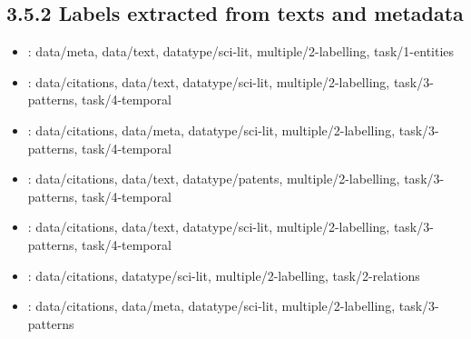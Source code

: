 \begin {refsection}
\section [3.5.2 Labels extracted from texts and metadata] {3.5.2 Labels extracted from texts and metadata}

\begin {itemize}
\item \cite {strobelt-2009-document-cards:-a-top-trumps-visualization-for-documents}:
    data/meta, data/text, datatype/sci-lit, multiple/2-labelling, task/1-entities


\item \cite {morris-2003-time-line-visualization-of-research-fronts}:
    data/citations, data/text, datatype/sci-lit, multiple/2-labelling, task/3-patterns, task/4-temporal


\item \cite {chen-2006-citespace-ii:-detecting-and-visualizing-emerging-trends}:
    data/citations, data/meta, datatype/sci-lit, multiple/2-labelling, task/3-patterns, task/4-temporal


\item \cite {sun-2008-timeline-and-crossmap-visualization-of-patents}:
    data/citations, data/text, datatype/patents, multiple/2-labelling, task/3-patterns, task/4-temporal


\item \cite {sharara-2011-g-pare:-a-visual-analytic-tool-for-comparative}:
    data/citations, data/text, datatype/sci-lit, multiple/2-labelling, task/3-patterns, task/4-temporal


\item \cite {small-1999-visualizing-science-by-citation-mapping}:
    data/citations, datatype/sci-lit, multiple/2-labelling, task/2-relations


\item \cite {ham-2004-case-study:-visualizing-visualization}:
    data/citations, data/meta, datatype/sci-lit, multiple/2-labelling, task/3-patterns


\end {itemize}
\printbibliography
\end {refsection}\pagebreak

